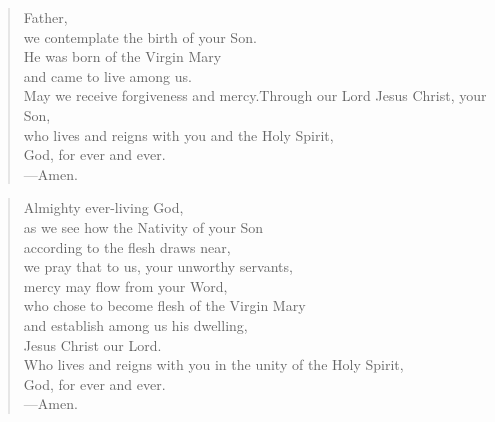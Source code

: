 \prayer

\setlength{\vleftmargin}{\prayerleftmargini}

\begin{verse}
Father,\\
we contemplate the birth of your Son.\\
He was born of the Virgin Mary\\
and came to live among us.\\
May we receive forgiveness and mercy.Through our Lord Jesus Christ, your Son, \\
who lives and reigns with you and the Holy Spirit, \\
God, for ever and ever.\\
{\color{red}---\thinspace}Amen.
\end{verse}


\begin{verse}
Almighty ever-living God,\\
as we see how the Nativity of your Son\\
according to the flesh draws near,\\
we pray that to us, your unworthy servants,\\
mercy may flow from your Word,\\
who chose to become flesh of the Virgin Mary\\
and establish among us his dwelling,\\
Jesus Christ our Lord.\\
Who lives and reigns with you in the unity of the Holy Spirit,\\
God, for ever and ever.\\
{\color{red}---\thinspace}Amen.

\end{verse}

\setlength{\vleftmargin}{\defleftmargini}